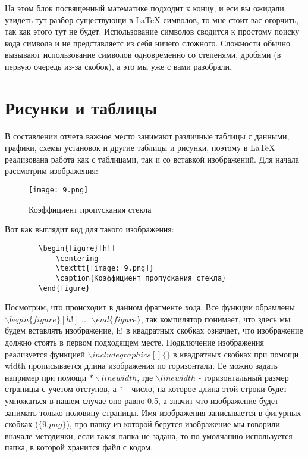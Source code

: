     
    
    На этом блок посвященный математике подходит к концу, и еси вы ожидали увидеть тут разбор существующи в \LaTeX{} символов, то мне стоит вас огорчить, так как этого тут не будет. Использование символов сводится к простому поиску кода символа и не представляетс из себя ничего сложного. Сложности обычно вызывают использование символов одновременно со степенями, дробями (в первую очередь из-за скобок), а это мы уже с вами разобрали.
    
    \section{Рисунки и таблицы}

    В составлении отчета важное место занимают различные таблицы с данными, графики, схемы установок и другие таблицы и рисунки, поэтому в \LaTeX{} реализована работа как с таблицами, так и со вставкой изображений. Для начала рассмотрим изображения:
    
    \begin{figure}[h!]
        \centering
        \texttt{[image: 9.png]}
        \caption{Коэффициент пропускания стекла}
    \end{figure}
    
    Вот как выглядит код для такого изображения:
    
    \begin{verbatim}
        \begin{figure}[h!]
            \centering
            \texttt{[image: 9.png]}
            \caption{Коэффициент пропускания стекла}
        \end{figure}
    \end{verbatim}
    
    Посмотрим, что происходит в данном фрагменте хода. Все функции обрамлены $\backslash begin\{figure\}[h!]$ ... $\backslash end\{figure\}$, так компилятор понимает, что здесь мы будем вставлять изображение, h! в квадратных скобках означает, что изображение должно стоять в первом подходящем месте. Подключение изображения реализуется функцией $\backslash includegraphics[]\{\}$ в квадратных скобках при помощи width прописывается длина изображения по горизонтали. Ее можно задать например при помощи $*\backslash linewidth$, где $\backslash linewidth$ - горизонтальный размер страницы с учетом отступов, а * - число, на которое длина этой строки будет умножаться в нашем случае оно равно 0.5, а значит что изображение будет занимать только половину страницы. Имя изображения записывается в фигурных скобках ($\{9.png\}$), про папку из которой берутся изображение мы говорили вначале методички, если такая папка не задана, то по умолчанию используется папка, в которой хранится файл с кодом.
    
